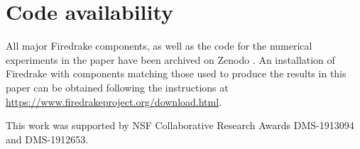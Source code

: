 \documentclass[format=acmsmall,screen,timestamp=false,a4paper]{acmart}
\newcommand\josh[1]{\textbf{\textcolor[rgb]{0,.5,1}{[Josh: #1]}}}
\begin{document}




\section*{Code availability}

All major Firedrake components, as well as the code for the numerical experiments in the paper have been archived on Zenodo \cite{zenodo/2021}. An installation of Firedrake with components matching those used to produce the results in this paper can be obtained following the instructions at \url{https://www.firedrakeproject.org/download.html}.

\begin{acks}
This work was supported by NSF Collaborative Research Awards DMS-1913094 and DMS-1912653.
    
  
\end{acks}



    

\end{document}
